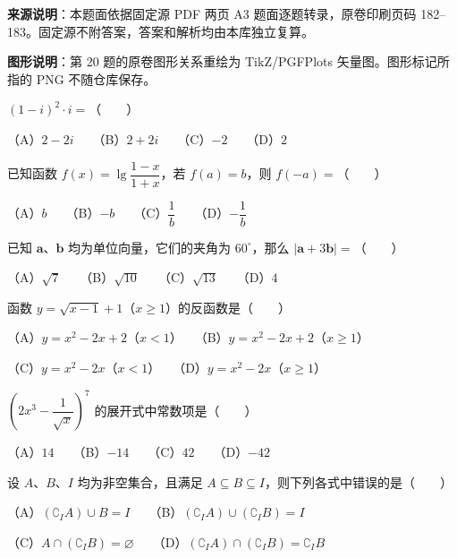 


\begin{gktip}
\textbf{来源说明}：本题面依据固定源 PDF 两页 A3 题面逐题转录，原卷印刷页码 182–183。固定源不附答案，答案和解析均由本库独立复算。

\textbf{图形说明}：第 20 题的原卷图形关系重绘为 TikZ/PGFPlots 矢量图。图形标记所指的 PNG 不随仓库保存。
\end{gktip}


\begin{question}
$(1-i)^2\cdot i=$\mbox{（　　）}

（A）$2-2i$　　（B）$2+2i$　　（C）$-2$　　（D）$2$

\end{question}
\begin{question}
已知函数 $f(x)=\lg\dfrac{1-x}{1+x}$，若 $f(a)=b$，则 $f(-a)=$\mbox{（　　）}

（A）$b$　　（B）$-b$　　（C）$\dfrac1b$　　（D）$-\dfrac1b$

\end{question}
\begin{question}
已知 $\boldsymbol a\text{、}\boldsymbol b$ 均为单位向量，它们的夹角为 $60^\circ$，那么 $|\boldsymbol a+3\boldsymbol b|=$\mbox{（　　）}

（A）$\sqrt7$　　（B）$\sqrt{10}$　　（C）$\sqrt{13}$　　（D）$4$

\end{question}
\begin{question}
函数 $y=\sqrt{x-1}+1$（$x\geqslant1$）的反函数是\mbox{（　　）}

（A）$y=x^2-2x+2$（$x<1$）　　（B）$y=x^2-2x+2$（$x\geqslant1$）

（C）$y=x^2-2x$（$x<1$）　　（D）$y=x^2-2x$（$x\geqslant1$）

\end{question}
\begin{question}
$\left(2x^3-\dfrac1{\sqrt{x}}\right)^7$ 的展开式中常数项是\mbox{（　　）}

（A）$14$　　（B）$-14$　　（C）$42$　　（D）$-42$

\end{question}
\begin{question}
设 $A\text{、}B\text{、}I$ 均为非空集合，且满足 $A\subseteq B\subseteq I$，则下列各式中错误的是\mbox{（　　）}

（A）$(\complement_I A)\cup B=I$　　（B）$(\complement_I A)\cup(\complement_I B)=I$

（C）$A\cap(\complement_I B)=\varnothing$　　（D）$(\complement_I A)\cap(\complement_I B)=\complement_I B$

\end{question}
